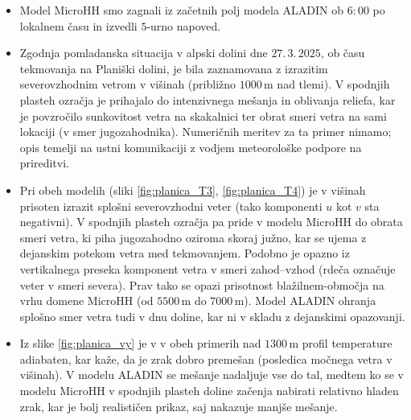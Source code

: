 \documentclass[mat2, tisk]{fmfdelo}
\begin{document}
\begin{itemize}
  \item Model MicroHH smo zagnali iz začetnih polj modela ALADIN ob \(6{:}00\) po lokalnem času in izvedli \(5\)-urno napoved.
  \item Zgodnja pomladanska situacija v alpski
   dolini dne \(27.\,3.\,2025\), ob času tekmovanja na 
   Planiški dolini, je bila zaznamovana z izrazitim 
   severovzhodnim vetrom v višinah 
   (približno \(1000\,\mathrm{m}\) nad tlemi). V 
   spodnjih plasteh ozračja je prihajalo do intenzivnega 
   mešanja in oblivanja reliefa, kar je povzročilo 
   sunkovitost vetra na skakalnici ter obrat smeri vetra 
   na sami lokaciji (v smer jugozahodnika). Numeričnih 
   meritev za ta primer nimamo; opis temelji na ustni 
   komunikaciji z vodjem meteorološke podpore na 
   prireditvi.
   \item Pri obeh modelih (sliki \ref{fig:planica_T3}, \ref{fig:planica_T4}) je v višinah prisoten izrazit 
   splošni severovzhodni veter (tako komponenti \(u\) 
   kot \(v\) sta negativni). V spodnjih plasteh ozračja 
   pa pride v modelu {MicroHH} do obrata smeri 
   vetra, ki piha jugozahodno oziroma skoraj južno, kar 
   se ujema z dejanskim potekom vetra med tekmovanjem. 
   Podobno je opazno iz vertikalnega preseka komponent 
   vetra v smeri zahod–vzhod (rdeča označuje veter v 
   smeri severa). Prav tako se opazi prisotnost 
   blažilnem-območja na vrhu domene {MicroHH} 
   (od \(5500\,\mathrm{m}\) do \(7000\,\mathrm{m}\)). 
   Model {ALADIN} ohranja splošno smer vetra tudi 
    v dnu doline, kar ni v skladu z dejanskimi opazovanji.
  \item Iz slike \ref{fig:planica_vy} je v v obeh primerih nad \(1300\,\mathrm{m}\) 
  profil temperature adiabaten, kar kaže, da je zrak 
  dobro premešan (posledica močnega vetra v višinah). 
  V modelu {ALADIN} se mešanje nadaljuje vse do 
  tal, medtem ko se v modelu {MicroHH} v spodnjih
  plasteh doline začenja nabirati relativno hladen zrak,
  kar je bolj realističen prikaz, saj nakazuje manjše 
  mešanje.

\end{itemize}

\end{document}
